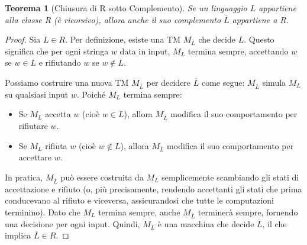\documentclass[a4paper]{article}
\newtheorem{theorem}{Teorema}
\begin{document}
\begin{theorem}[Chiusura di R sotto Complemento]
Se un linguaggio $L$ appartiene alla classe R (è ricorsivo), allora anche il suo complemento $\overline{L}$ appartiene a R.
\end{theorem}
\begin{proof}
Sia $L \in R$. Per definizione, esiste una TM $M_L$ che decide $L$. Questo significa che per ogni stringa $w$ data in input, $M_L$ termina sempre, accettando $w$ se $w \in L$ e rifiutando $w$ se $w \notin L$.

Possiamo costruire una nuova TM $M_{\overline{L}}$ per decidere $\overline{L}$ come segue:
$M_{\overline{L}}$ simula $M_L$ su qualsiasi input $w$. Poiché $M_L$ termina sempre:
\begin{itemize}
    \item Se $M_L$ accetta $w$ (cioè $w \in L$), allora $M_{\overline{L}}$ modifica il suo comportamento per rifiutare $w$.
    \item Se $M_L$ rifiuta $w$ (cioè $w \notin L$), allora $M_{\overline{L}}$ modifica il suo comportamento per accettare $w$.
\end{itemize}
In pratica, $M_{\overline{L}}$ può essere costruita da $M_L$ semplicemente scambiando gli stati di accettazione e rifiuto (o, più precisamente, rendendo accettanti gli stati che prima conducevano al rifiuto e viceversa, assicurandosi che tutte le computazioni terminino).
Dato che $M_L$ termina sempre, anche $M_{\overline{L}}$ terminerà sempre, fornendo una decisione per ogni input. Quindi, $M_{\overline{L}}$ è una macchina che decide $\overline{L}$, il che implica $\overline{L} \in R$.
\end{proof}
\end{document}

